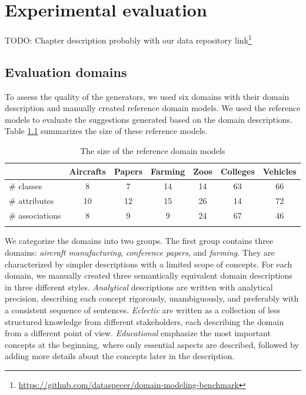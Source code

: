 \chapter{Experimental evaluation}

TODO: Chapter description probably with our data repository link\footnote{\url{https://github.com/dataspecer/domain-modeling-benchmark}}


\section{Evaluation domains}

To assess the quality of the generators, we used six domains with their domain description and manually created reference domain models.
We used the reference models to evaluate the suggestions generated based on the domain descriptions.
Table \ref{tab:reference-model-size} summarizes the size of these reference models.

\begin{table}[!h]
    \scriptsize
    \centering
    \setlength{\tabcolsep}{0.5em}
    \begin{tabular}{lcccccc}
         & Aircrafts & Papers & Farming & Zoos & Colleges & Vehicles \\
    \toprule
    \addlinespace
         \# classes      & 8  & 7  & 14 & 14 & 63 & 66 \\
         \# attributes   & 10 & 12 & 15 & 26 & 14 & 72 \\
         \# associations & 8  & 9  & 9  & 24 & 67 & 46 \\
    \addlinespace
    \bottomrule
    \addlinespace
    \end{tabular}
    \caption{The size of the reference domain models}
    \label{tab:reference-model-size}
\end{table}


We categorize the domains into two groups.
The first group contains three domains: \emph{aircraft manufacturing}, \emph{conference papers}, and \emph{farming}.
They are characterized by simpler descriptions with a limited scope of concepts.
For each domain, we manually created three semantically equivalent domain descriptions in three different styles.
\emph{Analytical} descriptions are written with analytical precision, describing each concept rigorously, unambiguously, and preferably with a consistent sequence of sentences.
\emph{Eclectic} are written as a collection of less structured knowledge from different stakeholders, each describing the domain from a different point of view.
\emph{Educational} emphasize the most important concepts at the beginning, where only essential aspects are described, followed by adding more details about the concepts later in the description.

